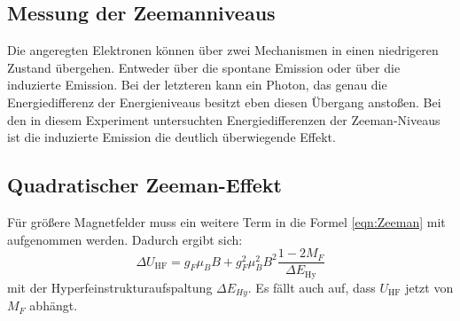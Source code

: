 \subsection{Messung der Zeemanniveaus}
Die angeregten Elektronen können über zwei Mechanismen in einen niedrigeren Zustand übergehen. Entweder über die spontane Emission oder über die induzierte Emission. Bei der letzteren kann ein Photon, das genau die Energiedifferenz der Energieniveaus besitzt eben diesen Übergang anstoßen. Bei den in diesem Experiment untersuchten Energiedifferenzen der Zeeman-Niveaus ist die induzierte Emission die deutlich überwiegende Effekt.
\subsection{Quadratischer Zeeman-Effekt}
Für größere Magnetfelder muss ein weitere Term in die Formel \eqref{eqn:Zeeman} mit aufgenommen werden. Dadurch ergibt sich:
\begin{equation}
	\Delta U_\text{HF}=g_F\mu_BB + g_F^2\mu_B^2B^2\frac{1-2M_F}{\Delta E_\text{Hy}}
	\label{quad}
\end{equation}
mit der Hyperfeinstrukturaufspaltung $\Delta E_{Hy}$. Es fällt auch auf, dass $U_\text{HF}$ jetzt von $M_F$ abhängt.
